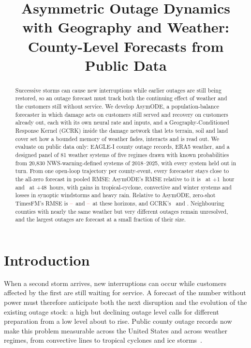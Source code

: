 \documentclass[10pt,twocolumn,letterpaper]{article}
\title{Asymmetric Outage Dynamics with Geography and Weather:\\ County-Level Forecasts from Public Data}
\author{\pending{Authors to be confirmed}}
\date{}
\newcommand{\pending}[1]{\textcolor{red}{#1}}
\providecommand{\TimesFMVsHostOne}{\pending{--}}\providecommand{\TimesFMVsHostOneCI}{\pending{--}}
\providecommand{\TimesFMVsHostFortyEight}{\pending{--}}\providecommand{\TimesFMVsHostFortyEightCI}{\pending{--}}
\begin{document}
\maketitle

\begin{abstract}
Successive storms can cause new interruptions while earlier outages are still being restored, so an outage forecast
must track both the continuing effect of weather and the customers still without service. We develop AsymODE, a
population-balance forecaster in which damage acts on customers still served and recovery on customers already out,
each with its own neural rate and inputs, and a Geography-Conditioned Response Kernel (GCRK) inside the damage
network that lets terrain, soil and land cover set how a bounded memory of weather fades, interacts and is read out.
We evaluate on public data only: EAGLE-I county outage records, ERA5 weather, and a designed panel of 81 weather
systems of five regimes drawn with known probabilities from 20,830 NWS-warning-defined systems of 2018--2025, with
every system held out in turn. From one open-loop trajectory per county-event, every forecaster stays close to the
all-zero forecast in pooled RMSE: AsymODE's RMSE relative to it is \HostVsZeroOne\ at +1~hour and
\HostVsZeroFortyEight\ at +48~hours, with gains in tropical-cyclone, convective and winter systems and losses in
synoptic windstorms and heavy rain. Relative to AsymODE, zero-shot TimesFM's RMSE is \TimesFMVsHostOne\ and
\TimesFMVsHostFortyEight\ at these horizons, and GCRK's \GCRKVsHostOne\ and \GCRKVsHostFortyEight. Neighbouring
counties with nearly the same weather but very different outages remain unresolved, and the largest outages are
forecast at a small fraction of their size.
\end{abstract}

\section{Introduction}
When a second storm arrives, new interruptions can occur while customers affected by the first are still waiting for
service. A forecast of the number without power must therefore anticipate both the next disruption and the evolution of
the existing outage stock: a high but declining outage level calls for different preparation from a low level about to
rise. Public county outage records now make this problem measurable across the United States and across weather
regimes, from convective lines to tropical cyclones and ice storms~\cite{brelsford2024}.
\end{document}
